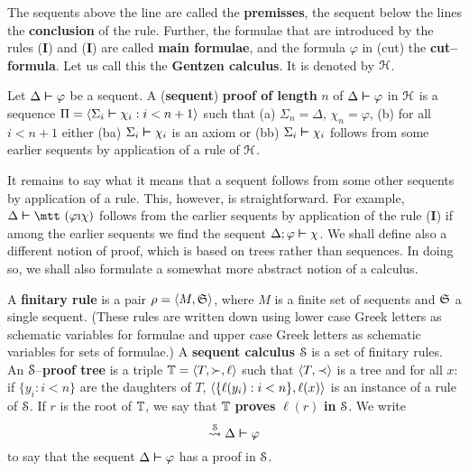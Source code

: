 The sequents above the line are called the \textbf{premisses}, the sequent
below the lines the \textbf{conclusion} of the rule. Further, the
formulae that are introduced by the rules ({\mtt{}}\textbf{I}) 
and (\textbf{I}{\mtt{}}) are called \textbf{main formulae}, 
and the formula $\varphi$ in (cut) the \textbf{cut--formula}. Let 
us call this the \textbf{Gentzen calculus}. It is denoted by $\mathcal{H}$.
\begin{defn}
Let $\Delta \boldsymbol{\vdash} \varphi$ be a sequent. A (\textbf{sequent}) 
\textbf{proof of length} $n$ of $\Delta \boldsymbol{\vdash} \varphi$ in $\mathcal{H}$ is a
sequence $\Pi = \langle \Sigma_i \boldsymbol{\vdash} \chi_i : i < n+1\rangle$ such
that (a) $\Sigma_n = \Delta$, $\chi_n = \varphi$, (b) for all $i <
n+1$ either (ba) $\Sigma_i \boldsymbol{\vdash} \chi_i$ is an axiom or (bb)
$\Sigma_i \boldsymbol{\vdash} \chi_i$ follows from some earlier sequents by
application of a rule of $\mathcal{H}$.
\end{defn}
It remains to say what it means that a sequent follows from some
other sequents by application of a rule. This, however, is straightforward.
For example, $\Delta \bvdash \mbox{\mtt ($\varphi$\symbol{25}$\chi$%
)}$ follows from the earlier sequents by application of the rule
(\textbf{I}{\mtt{}}) if among the earlier sequents we find 
the sequent $\Delta;\varphi \boldsymbol{\vdash} \chi$. We shall define also a different
notion of proof, which is based on trees rather than sequences.
In doing so, we shall also formulate a somewhat more abstract
notion of a calculus.
\begin{defn}
A \textbf{finitary rule} is a pair $\rho = \langle M, \mathfrak{S}\rangle$, where
$M$ is a finite set of sequents and $\mathfrak{S}$ a single sequent. (These
rules are written down using lower case Greek letters as schematic
variables for formulae and upper case Greek letters as schematic
variables for sets of formulae.) A \textbf{sequent calculus} $\mathcal{S}$
is a set of finitary rules. An $\mathcal{S}$--\textbf{proof tree} is a
triple $\mathbb{T} = \langle T, \succ, \ell\rangle$ such that $\langle T, \prec\rangle$
is a tree and for all $x$: if $\{y_i : i < n\}$ are the daughters
of $T$, $\langle \{\ell(y_i) : i < n\}, \ell(x)\rangle$ is an instance of
a rule of $\mathcal{S}$. If $r$ is the root of $\mathbb{T}$, we say that $\mathbb{T}$
\textbf{proves} $\ell(r)$ \textbf{in} $\mathcal{S}$. We write
\begin{equation}
\stackrel{\mathcal{S}}{\rightsquigarrow} \Delta \boldsymbol{\vdash} \varphi
\end{equation}
to say that the sequent $\Delta\boldsymbol{\vdash} \varphi$ has a proof in $\mathcal{S}$.
\end{defn}
